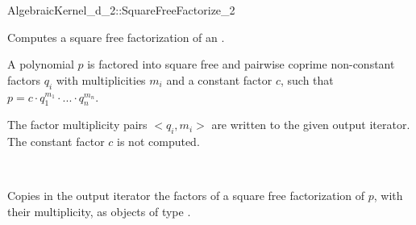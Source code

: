 \begin{ccRefFunctionObjectConcept}{AlgebraicKernel_d_2::SquareFreeFactorize_2}

\ccDefinition
Computes a square free factorization of an
.

A polynomial $p$ is factored into square free and pairwise 
coprime non-constant factors $q_i$ with multiplicities $m_i$ 
and a constant factor $c$, such that 
$p = c  \cdot  q_1^{m_1}  \cdot  ...  \cdot  q_n^{m_n}$.

The factor multiplicity pairs $<q_i,m_i>$ are written to the 
given output iterator. The constant factor $c$ is not computed. 

\ccRefines 
{}\\

\ccOperations \ccThree{+++++++++}{+++++++++}{}



{Copies in the output iterator the factors of a square free 
factorization of $p$, with their multiplicity, as objects of type 
.}

\ccSeeAlso
{}\\
\\

\end{ccRefFunctionObjectConcept}
